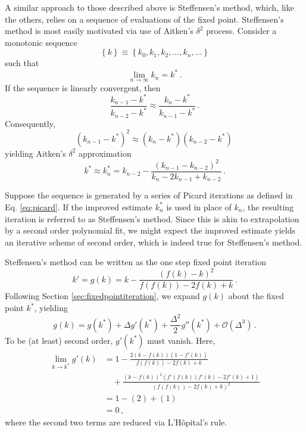 A similar approach to those described above is Steffensen's method, which, 
like the others, relies on a sequence of evaluations of the fixed point.
Steffensen's method is most easily motivated via use of
Aitken's $\delta^2$ process. Consider a monotonic sequence
\begin{equation}
  \left \{k \right \} \equiv 
    \left \{ k_0, k_1, k_2, \ldots, k_n, \ldots \right \}
\end{equation}
such that
\begin{equation}
 \lim_{n\to \infty} k_n = k^* \, .
\end{equation}
If the sequence is linearly convergent, then
\begin{equation}
 \frac{k_{n-1} - k^*}{k_{n-2} - k^*} 
   \approx  \frac{k_{n} - k^*}{k_{n-1} - k^*} \, .
\end{equation}
Consequently, 
\begin{equation}
 (k_{n-1} - k^*)^2 \approx (k_{n} - k^*)(k_{n-2} - k^*) \,
\end{equation}
yielding Aitken's $\delta^2$ approximation
\begin{equation}
 k^* \approx k^*_{n} 
   = k_{n-2} - \frac{ (k_{n-1} - k_{n-2})^2 }
                    { k_{n} - 2 k_{n-1} + k_{n-2} } \, .
\end{equation}

Suppose the sequence is generated by a series of Picard
iterations as defined in Eq. \ref{eq:picard}.
If the improved estimate $k^*_{n}$ is used in place of $k_n$, the 
resulting iteration is referred to as Steffensen's method.  Since 
this is akin to extrapolation by a second order polynomial fit, we might 
expect the improved estimate yields an iterative scheme 
of second order, which is indeed true for Steffensen's method.

Steffensen's method can be written as the one step fixed point iteration
\begin{equation}
 k' = g(k) = k - \frac{(f(k) - k)^2} 
                     {f(f(k)) - 2 f(k) + k}  \, .
\end{equation}
Following Section \ref{sec:fixedpointiteration}, we expand $g(k)$ about
the fixed point $k^*$, yielding 
\begin{equation}
 g(k) = g(k^*) + \Delta g'(k^*) + \frac{\Delta^2}{2} g''(k^*) 
               + \mathcal{O}(\Delta^3) \, .
\end{equation}
To be (at least) second order, $g'(k^*)$ must vanish.  Here,
\begin{equation}
\begin{split}
  \lim_{k\to k^*}
    g'(k) &= 1 - \frac{2(k-f(k))(1-f'(k))}
                      {f(f(k))-2f(k)+k}\\
          & \quad + \frac{(k-f(k))^2(f'(f(k))f'(k) - 2f'(k)+1)}
                      {(f(f(k))-2f(k)+k)^2} \\
          &= 1 - (2) + (1) \\
          &= 0 \, ,
\end{split}
\end{equation}
where the second two terms are reduced via L'H\^{o}pital's rule.

